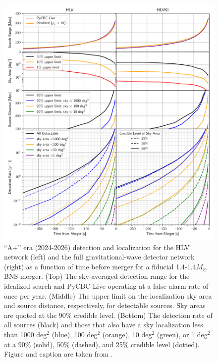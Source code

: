 \begin{figure}
	\centering
	\includegraphics[width=\textwidth]{chapters/forecasting/images/aplus.pdf}
	\caption[``A+'' era detection ranges, localizations, distances, and merger rates]{``A+'' era (2024-2026)  detection and localization for the HLV network (left) and the full gravitational-wave detector network (right) as a function of time before merger for a fiducial 1.4-1.4$M_\odot$ BNS merger. (Top) The sky-averaged detection range for the idealized search and PyCBC Live operating at a false alarm rate of once per year. (Middle) The upper limit on the localization sky area and source distance, respectively, for detectable sources. Sky areas are quoted at the 90$\%$ credible level. (Bottom) The detection rate of all sources (black) and those that also have a sky localization less than 1000 deg$^2$ (blue), 100 deg$^2$ (orange), 10 deg$^2$ (green), or 1 deg$^2$ at a 90$\%$ (solid), 50$\%$ (dashed), and 25$\%$ credible level (dotted). Figure and caption are taken from \cite{Nitz:2020vym}.}\label{fig:res_aplus}
\end{figure}
